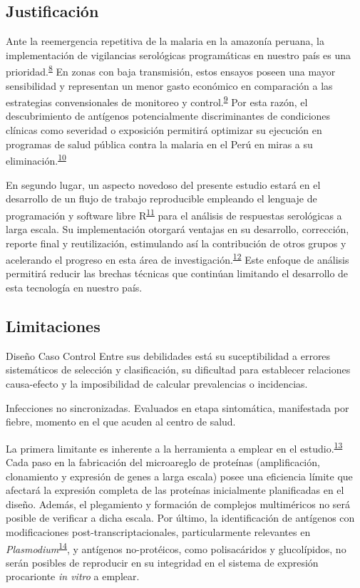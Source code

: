 \documentclass[]{article}
\begin{document}
\subsection{Justificación}\label{justif}

Ante la reemergencia repetitiva de la malaria en la amazonía peruana, la
implementación de vigilancias serológicas programáticas en nuestro país
es una
prioridad.\textsuperscript{\protect\hyperlink{ref-hotspots2015}{8}} En
zonas con baja transmisión, estos ensayos poseen una mayor sensibilidad
y representan un menor gasto económico en comparación a las estrategias
convensionales de monitoreo y
control.\textsuperscript{\protect\hyperlink{ref-elliott2014}{9}} Por
esta razón, el descubrimiento de antígenos potencialmente discriminantes
de condiciones clínicas como severidad o exposición permitirá optimizar
su ejecución en programas de salud pública contra la malaria en el Perú
en miras a su
eliminación.\textsuperscript{\protect\hyperlink{ref-accelerate2016}{10}}

En segundo lugar, un aspecto novedoso del presente estudio estará en el
desarrollo de un flujo de trabajo reproducible empleando el lenguaje de
programación y software libre
R\textsuperscript{\protect\hyperlink{ref-R}{11}} para el análisis de
respuestas serológicas a larga escala. Su implementación otorgará
ventajas en su desarrollo, corrección, reporte final y reutilización,
estimulando así la contribución de otros grupos y acelerando el progreso
en esta área de
investigación.\textsuperscript{\protect\hyperlink{ref-CienciaReproducible2016}{12}}
Este enfoque de análisis permitirá reducir las brechas técnicas que
continúan limitando el desarrollo de esta tecnología en nuestro país.

\subsection{Limitaciones}\label{limit}

Diseño Caso Control Entre sus debilidades está su suceptibilidad a
errores sistemáticos de selección y clasificación, su dificultad para
establecer relaciones causa-efecto y la imposibilidad de calcular
prevalencias o incidencias.

Infecciones no sincronizadas. Evaluados en etapa sintomática,
manifestada por fiebre, momento en el que acuden al centro de salud.

La primera limitante es inherente a la herramienta a emplear en el
estudio.\textsuperscript{\protect\hyperlink{ref-vigil2010}{13}} Cada
paso en la fabricación del microareglo de proteínas (amplificación,
clonamiento y expresión de genes a larga escala) posee una eficiencia
límite que afectará la expresión completa de las proteínas inicialmente
planificadas en el diseño. Además, el plegamiento y formación de
complejos multiméricos no será posible de verificar a dicha escala. Por
último, la identificación de antígenos con modificaciones
post-transcriptacionales, particularmente relevantes en
\emph{Plasmodium}\textsuperscript{\protect\hyperlink{ref-leroch2009postmod}{14}},
y antígenos no-protéicos, como polisacáridos y glucolípidos, no serán
posibles de reproducir en su integridad en el sistema de expresión
procarionte \emph{in vitro} a emplear.
\end{document}
